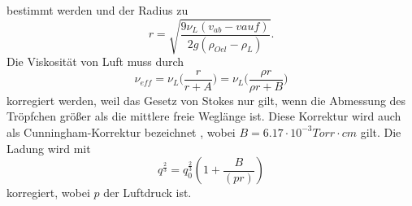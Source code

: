 bestimmt werden und der Radius zu
\begin{equation}
    r = \sqrt{\frac{9 \nu_L (v_{ab}-v{auf})}{2 g (\rho_{Oel}-\rho_L)}}.
    \label{eqn:Radius}
\end{equation}
Die Viskosität von Luft muss durch 
\begin{equation}
    \nu_{eff} = \nu_L \Biggl(\frac{r}{r + A}\Biggr) = \nu_L \Biggl(\frac{\rho r}{\rho r + B}\Biggr)
    \label{eqn:nu_kor}
\end{equation}
korregiert werden, weil das Gesetz von Stokes nur gilt, wenn die Abmessung des Tröpfchen größer als die mittlere
freie Weglänge ist. Diese Korrektur wird auch als Cunningham-Korrektur bezeichnet , wobei $B = 6.17 \cdot 10^{-3} Torr \cdot cm$ gilt.
Die Ladung wird mit 
\begin{equation}
    q^{\frac{2}{3}} = q^{\frac{2}{3}}_0 (1 + \frac{B}{(p r)})
    \label{eqn:Ladung_kor}
\end{equation}
korregiert, wobei $p$ der Luftdruck ist.